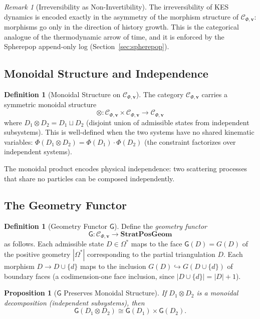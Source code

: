 \documentclass[12pt, oneside]{amsart}
\theoremstyle{plain}
\newtheorem{proposition}[theorem]{Proposition}
\theoremstyle{definition}
\newtheorem{definition}[theorem]{Definition}
\theoremstyle{remark}
\newtheorem{remark}[theorem]{Remark}
\newcommand{\Phif}{\Phi}   %
\newcommand{\OmKS}{\Omega}
\newcommand{\SPG}{\mathbf{StratPosGeom}}
\newcommand{\Ccat}{\mathcal{C}_{\Phi,\mathbf{v}}}
\newcommand{\Gfun}{\mathsf{G}}
\begin{document}
\begin{remark}[Irreversibility as Non-Invertibility]
The irreversibility of KES dynamics is encoded exactly in the asymmetry of the morphism structure of $\Ccat$: morphisms go only in the direction of history growth. This is the categorical analogue of the thermodynamic arrow of time, and it is enforced by the Spherepop append-only log (Section~\ref{sec:spherepop}).
\end{remark}

\subsection{Monoidal Structure and Independence}

\begin{definition}[Monoidal Structure on $\Ccat$]
The category $\Ccat$ carries a symmetric monoidal structure
\[
  \otimes: \Ccat \times \Ccat \to \Ccat
\]
where $D_1 \otimes D_2 = D_1 \sqcup D_2$ (disjoint union of admissible states from independent subsystems). This is well-defined when the two systems have no shared kinematic variables: $\Phif(D_1 \otimes D_2) = \Phif(D_1) \cdot \Phif(D_2)$ (the constraint factorizes over independent systems).
\end{definition}

The monoidal product encodes physical independence: two scattering processes that share no particles can be composed independently.

\subsection{The Geometry Functor}

\begin{definition}[Geometry Functor $\Gfun$]
\label{def:geometry-functor}
Define the \emph{geometry functor}
\[
  \Gfun: \Ccat \to \SPG
\]
as follows. Each admissible state $D \in \OmKS^*$ maps to the face $\Gfun(D) = G(D)$ of the positive geometry $|\OmKS^*|$ corresponding to the partial triangulation $D$. Each morphism $D \to D \cup \{d\}$ maps to the inclusion $G(D) \hookrightarrow G(D \cup \{d\})$ of boundary faces (a codimension-one face inclusion, since $|D \cup \{d\}| = |D| + 1$).
\end{definition}

\begin{proposition}[$\Gfun$ Preserves Monoidal Structure]
If $D_1 \otimes D_2$ is a monoidal decomposition (independent subsystems), then
\[
  \Gfun(D_1 \otimes D_2) \cong \Gfun(D_1) \times \Gfun(D_2).
\]
\end{proposition}
\end{document}
